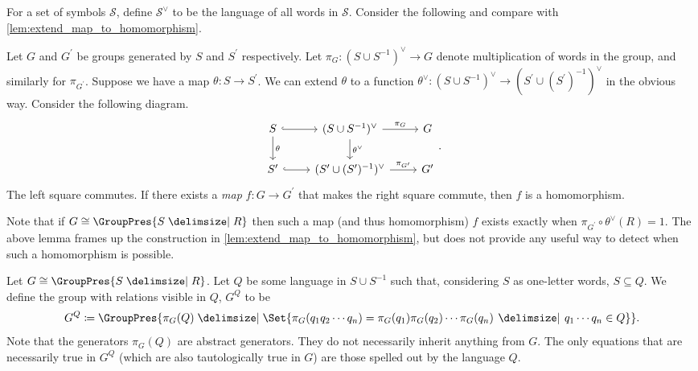For a set of symbols $\mathcal{S}$, define  $\mathcal{S}^\vee$ to be the language of all words in  $\mathcal{S}$.
Consider the following and compare with \cref{lem:extend_map_to_homomorphism}.

\begin{lemma}
	Let $G$ and $G^\prime$ be groups generated by $S$ and $S^\prime$ respectively. Let $\pi_G \colon (S \cup S^{-1})^\vee \to G$ denote multiplication of words in the group, and similarly for $\pi_{G^\prime}$.
	Suppose we have a map  $\theta \colon S \to S^\prime$.
	We can extend $\theta$ to a function $\theta^\vee \colon (S \cup S^{-1})^\vee \to (S^\prime \cup (S^\prime)^{-1})^\vee$ in the obvious way.
	Consider the following diagram.
	\[
		\begin{tikzcd}
			S \ar[d, "\theta"] \ar[r, hook] & (S \cup S^{-1})^\vee \ar[d, "\theta^\vee"] \ar[r, "\pi_G"] & G \\
			S^\prime \ar[r, hook] & (S^\prime \cup (S^\prime)^{-1})^\vee \ar[r, "\pi_{G^\prime}"] & G^\prime
		\end{tikzcd}
		.\]
	The left square commutes. If there exists a \emph{map} $f \colon G \to G^\prime$ that makes the right square commute, then $f$ is a homomorphism.
	\label{lem:homomorphism_squares}
\end{lemma}
\begin{remark}
	Note that if $G \cong \GroupPres{S \relations R}$ then such a map (and thus homomorphism) $f$ exists exactly when  $\pi_{G^\prime} \circ \theta^\vee (R) = 1$. The above lemma frames up the construction in \cref{lem:extend_map_to_homomorphism}, but does not provide any useful way to detect when such a homomorphism is possible.
	\label{rem:when_does_map_exist}
\end{remark}

\begin{definition}
	Let $G \cong \GroupPres{S \relations R}$. Let  $Q$ be some language in  $S \cup S^{-1}$ such that, considering  $S$ as one-letter words, $S \subseteq Q$. We define the group with relations visible in $Q$,  $G^Q$ to be
	\[
		G^Q \coloneqq \GroupPres{\pi_G(Q) \relations \Set{\pi_G(q_1q_2\cdots q_n) = \pi_G(q_1)\pi_G(q_2) \cdots \pi_G(q_n) \given q_1\cdots q_n \in Q} }
		.\]
	Note that the generators $\pi_G(Q)$ are abstract generators. They do not necessarily inherit anything from $G$. The only equations that are necessarily true in  $G^Q$ (which are also tautologically true in $G$) are those spelled out by the language $Q$.
	\label{def:group_relations_visible_in_Q}
\end{definition}

